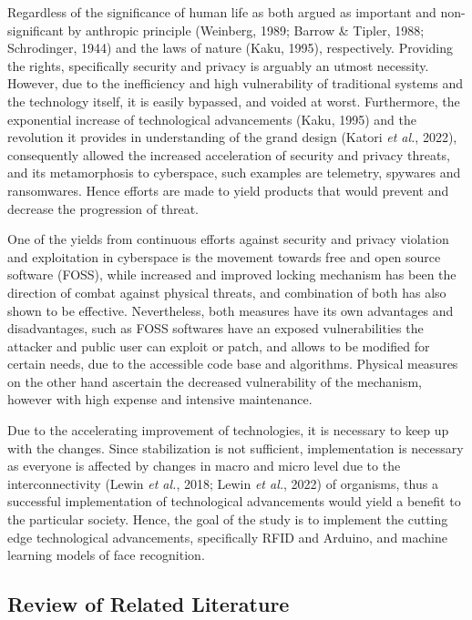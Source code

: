\documentclass[12pt]{article}
\newcommand{\etl}{\textit{et al.}}
\begin{document}
Regardless of the significance of human life as both argued as important and non-significant by anthropic principle (Weinberg, 1989; Barrow \& Tipler, 1988; Schrodinger, 1944) and the laws of nature (Kaku, 1995), respectively. Providing the rights, specifically security and privacy is arguably an utmost necessity. However, due to the inefficiency and high vulnerability of traditional systems and the technology itself, it is easily bypassed, and voided at worst. Furthermore, the exponential increase of technological advancements (Kaku, 1995) and the revolution it provides in understanding  of the grand design (Katori \etl, 2022), consequently allowed the increased acceleration of security and privacy threats, and its metamorphosis to cyberspace, such examples are telemetry, spywares and ransomwares. Hence efforts are made to yield products that would prevent and decrease the progression of threat.

One of the yields from continuous efforts against security and privacy violation and exploitation in cyberspace is the movement towards free and open source software (FOSS), while increased and improved locking mechanism has been the direction of combat against physical threats, and combination of both has also shown to be effective. Nevertheless, both measures have its own advantages and disadvantages, such as FOSS softwares have an exposed vulnerabilities the attacker and public user can exploit or patch, and allows to be modified for certain needs, due to the accessible code base and algorithms. Physical measures on the other hand ascertain the decreased vulnerability of the mechanism, however with high expense and intensive maintenance.

Due to the accelerating improvement of technologies, it is necessary to keep up with the changes. Since stabilization is not sufficient, implementation is necessary as everyone is affected by changes in macro and micro level due to the interconnectivity (Lewin \etl, 2018; Lewin \etl, 2022) of organisms, thus a successful implementation of technological advancements would yield a benefit to the particular society. Hence, the goal of the study is to implement the cutting edge technological advancements, specifically RFID and Arduino, and machine learning models of face recognition.

\subsection*{Review of Related Literature\centering}
\end{document}
